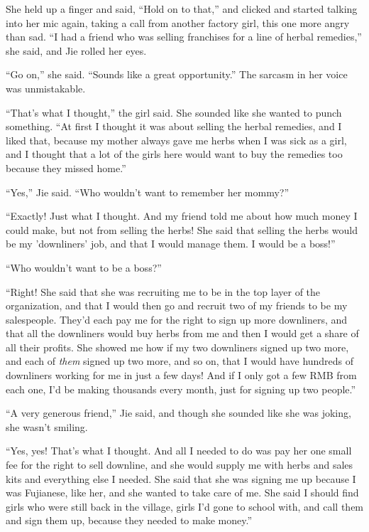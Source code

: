 She held up a finger and said, ``Hold on to that,'' and clicked and
started talking into her mic again, taking a call from another
factory girl, this one more angry than sad. ``I had a friend who was
selling franchises for a line of herbal remedies,'' she said, and
Jie rolled her eyes.

``Go on,'' she said. ``Sounds like a great opportunity.'' The sarcasm
in her voice was unmistakable.

``That's what I thought,'' the girl said. She sounded like she wanted
to punch something. ``At first I thought it was about selling the
herbal remedies, and I liked that, because my mother always gave me
herbs when I was sick as a girl, and I thought that a lot of the
girls here would want to buy the remedies too because they missed
home.''

``Yes,'' Jie said. ``Who wouldn't want to remember her mommy?''

``Exactly! Just what I thought. And my friend told me about how much
money I could make, but not from selling the herbs! She said that
selling the herbs would be my 'downliners' job, and that I would
manage them. I would be a boss!''

``Who wouldn't want to be a boss?''

``Right! She said that she was recruiting me to be in the top layer
of the organization, and that I would then go and recruit two of my
friends to be my salespeople. They'd each pay me for the right to
sign up more downliners, and that all the downliners would buy
herbs from me and then I would get a share of all their profits.
She showed me how if my two downliners signed up two more, and each
of \emph{them} signed up two more, and so on, that I would have
hundreds of downliners working for me in just a few days! And if I
only got a few RMB from each one, I'd be making thousands every
month, just for signing up two people.''

``A very generous friend,'' Jie said, and though she sounded like she
was joking, she wasn't smiling.

``Yes, yes! That's what I thought. And all I needed to do was pay
her one small fee for the right to sell downline, and she would
supply me with herbs and sales kits and everything else I needed.
She said that she was signing me up because I was Fujianese, like
her, and she wanted to take care of me. She said I should find
girls who were still back in the village, girls I'd gone to school
with, and call them and sign them up, because they needed to make
money.''

